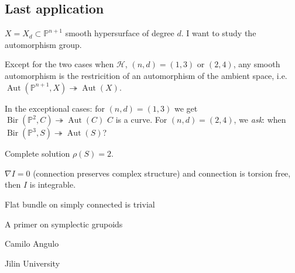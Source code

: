 \subsection{Last application}

\(X=X_d \subset \mathbb{P}^{n+1}\) smooth hypersurface of degree \(d\). I want to study the automorphism group.

\begin{thm}\leavevmode
Except for the two cases when \(\mathcal{H}\), \((n,d)=(1,3)\) or \((2,4)\), any smooth automorphism is the restricition of an automorphism of the ambient space, i.e. \(\operatorname{Aut}(\mathbb{P}^{n+1},X)\twoheadrightarrow \operatorname{Aut}(X)\).

In the exceptional cases: for \((n,d)=(1,3)\) we get \(\operatorname{Bir}(\mathbb{P}^2,C) \twoheadrightarrow \operatorname{Aut}(C)\) {\color{6}\(C\) is a curve}. For \((n,d)=(2,4)\), we  \textit{ask}: when \(\operatorname{Bir}(\mathbb{P}^3,S) \twoheadrightarrow \operatorname{Aut}(S)\)?
\end{thm}

\begin{thm}\leavevmode
Complete solution \(\rho(S)=2\).
\end{thm}







\begin{thm}\leavevmode
\(\nabla I = 0\) (connection preserves complex structure) and connection is torsion free, then \(I \) is integrable.
\end{thm}

\begin{exercise}\leavevmode

Flat bundle on simply connected is trivial
\end{exercise}


\clearpage{}
{\Huge A primer on symplectic grupoids}

\hfill{\Large Camilo Angulo}

{\Large \hfill Jilin University}

